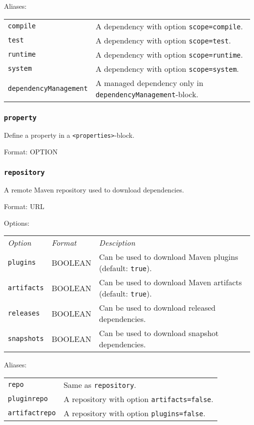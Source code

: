 \documentclass[a4paper,12pt,english,oneside,halfparskip]{scrartcl}
\newcommand{\code}[1]{\texttt{#1}}
\begin{document}
Aliases:

\begin{tabular}{ll}
\code{compile} &  A dependency with option \code{scope=compile}. \\
\code{test} & A dependency with option \code{scope=test}. \\
\code{runtime} & A dependency with option \code{scope=runtime}. \\
\code{system} & A dependency with option \code{scope=system}. \\
\code{\small dependencyManagement} &  A managed dependency only in \code{dependencyManagement}-block. \\
\end{tabular}



\subsubsection{\code{property}}

Define a property in a \code{<properties>}-block.

Format: OPTION

\subsubsection{\code{repository}}

A remote Maven repository used to download dependencies.

Format: URL

Options:

\begin{tabular}{llp{}}
\emph{Option} & \emph{Format} & \emph{Desciption} \\
\code{plugins} &  BOOLEAN & Can be used to download Maven plugins (default: \code{true}). \\
\code{artifacts} &  BOOLEAN & Can be used to download Maven artifacts (default: \code{true}). \\
\code{releases} &  BOOLEAN & Can be used to download released dependencies. \\
\code{snapshots} &  BOOLEAN & Can be used to download snapshot dependencies. \\
\end{tabular}

Aliases:

\begin{tabular}{ll}
\code{repo} &  Same as \code{repository}. \\
\code{pluginrepo} & A repository with option \code{artifacts=false}. \\
\code{artifactrepo} &  A repository with option \code{plugins=false}. \\
\end{tabular}
\end{document}
